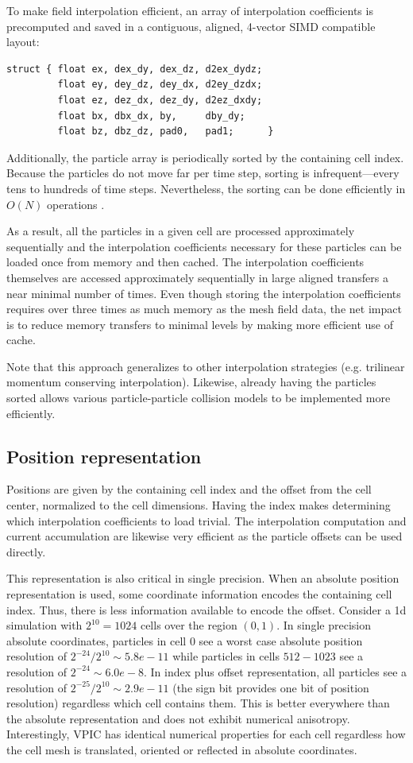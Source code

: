 \documentclass[aps,prl,preprint,preprintnumbers,groupedaddress]{revtex4}
\begin{document}
To make field interpolation efficient, an array of interpolation
coefficients is precomputed and saved in a contiguous, aligned,
4-vector SIMD compatible layout:
\begin{verbatim}
struct { float ex, dex_dy, dex_dz, d2ex_dydz;
         float ey, dey_dz, dey_dx, d2ey_dzdx;
         float ez, dez_dx, dez_dy, d2ez_dxdy;
         float bx, dbx_dx, by,     dby_dy;
         float bz, dbz_dz, pad0,   pad1;      }
\end{verbatim}
Additionally, the particle array is periodically sorted by the
containing cell index.  Because the particles do not move far per time
step, sorting is infrequent---every tens to hundreds of time steps.
Nevertheless, the sorting can be done efficiently in $O(N)$ operations
\cite{Bowers_2001}.

As a result, all the particles in a given cell are processed
approximately sequentially and the interpolation coefficients
necessary for these particles can be loaded once from memory and then
cached.  The interpolation coefficients themselves are accessed
approximately sequentially in large aligned transfers a near minimal
number of times.  Even though storing the interpolation coefficients
requires over three times as much memory as the mesh field data, the
net impact is to reduce memory transfers to minimal levels by making
more efficient use of cache.

Note that this approach generalizes to other interpolation strategies
(e.g. trilinear momentum conserving interpolation).  Likewise, already
having the particles sorted allows various particle-particle
collision models to be implemented more efficiently.

\subsection{Position representation}

Positions are given by the containing cell index and the offset from
the cell center, normalized to the cell dimensions.  Having the index
makes determining which interpolation coefficients to load trivial.
The interpolation computation and current accumulation are likewise
very efficient as the particle offsets can be used directly.

This representation is also critical in single precision.  When an
absolute position representation is used, some coordinate information
encodes the containing cell index.  Thus, there is less information
available to encode the offset.  Consider a 1d simulation with $2^{10}
= 1024$ cells over the region $(0,1)$.  In single precision absolute
coordinates, particles in cell $0$ see a worst case absolute position
resolution of $2^{-24}/2^{10} \sim 5.8e-11$ while particles in cells
$512-1023$ see a resolution of $2^{-24} \sim 6.0e-8$.  In index plus
offset representation, all particles see a resolution of
$2^{-25}/2^{10} \sim 2.9e-11$ (the sign bit provides one bit of
position resolution) regardless which cell contains them.  This is
better everywhere than the absolute representation and does not
exhibit numerical anisotropy.  Interestingly, VPIC has identical
numerical properties for each cell regardless how the cell mesh is
translated, oriented or reflected in absolute coordinates.
\end{document}
